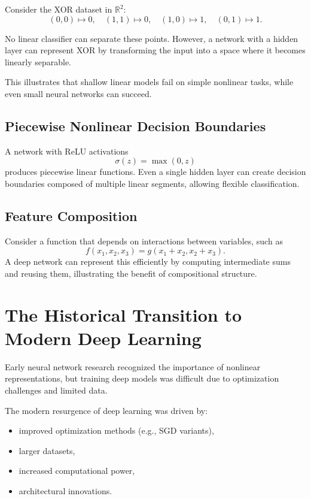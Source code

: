 Consider the XOR dataset in $\mathbb R^2$:
\[
(0,0)\mapsto 0,\quad (1,1)\mapsto 0,\quad (1,0)\mapsto 1,\quad (0,1)\mapsto 1.
\]

No linear classifier can separate these points. However, a network with a hidden layer can represent XOR by transforming the input into a space where it becomes linearly separable.

This illustrates that shallow linear models fail on simple nonlinear tasks, while even small neural networks can succeed.

\subsection{Piecewise Nonlinear Decision Boundaries}

A network with ReLU activations
\[
\sigma(z)=\max(0,z)
\]
produces piecewise linear functions. Even a single hidden layer can create decision boundaries composed of multiple linear segments, allowing flexible classification.

\subsection{Feature Composition}

Consider a function that depends on interactions between variables, such as
\[
f(x_1,x_2,x_3)=g(x_1+x_2, x_2+x_3).
\]
A deep network can represent this efficiently by computing intermediate sums and reusing them, illustrating the benefit of compositional structure.

\section{The Historical Transition to Modern Deep Learning}

Early neural network research recognized the importance of nonlinear representations, but training deep models was difficult due to optimization challenges and limited data.

The modern resurgence of deep learning was driven by:
\begin{itemize}
    \item improved optimization methods (e.g., SGD variants),
    \item larger datasets,
    \item increased computational power,
    \item architectural innovations.
\end{itemize}

